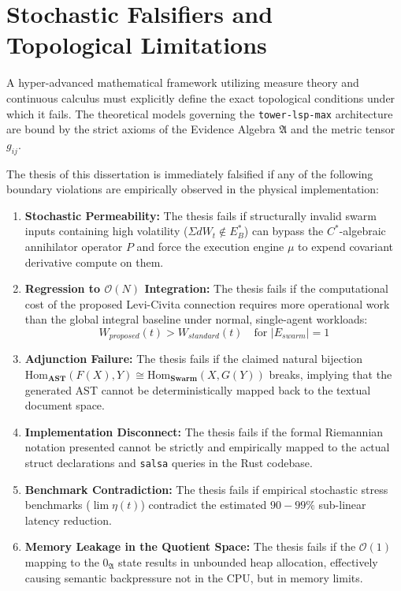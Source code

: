 \section{Stochastic Falsifiers and Topological Limitations}

A hyper-advanced mathematical framework utilizing measure theory and continuous calculus must explicitly define the exact topological conditions under which it fails. The theoretical models governing the \texttt{tower-lsp-max} architecture are bound by the strict axioms of the Evidence Algebra $\mathfrak{A}$ and the metric tensor $g_{ij}$. 

The thesis of this dissertation is immediately falsified if any of the following boundary violations are empirically observed in the physical implementation:

\begin{enumerate}
    \item \textbf{Stochastic Permeability:} The thesis fails if structurally invalid swarm inputs containing high volatility ($\Sigma dW_t \notin E_B^*$) can bypass the $C^*$-algebraic annihilator operator $P$ and force the execution engine $\mu$ to expend covariant derivative compute on them.
    \item \textbf{Regression to $\mathcal{O}(N)$ Integration:} The thesis fails if the computational cost of the proposed Levi-Civita connection requires more operational work than the global integral baseline under normal, single-agent workloads:
    \begin{equation}
    W_{proposed}(t) > W_{standard}(t) \quad \text{for } |E_{swarm}| = 1
    \end{equation}
    \item \textbf{Adjunction Failure:} The thesis fails if the claimed natural bijection $\text{Hom}_{\mathbf{AST}}(F(X), Y) \cong \text{Hom}_{\mathbf{Swarm}}(X, G(Y))$ breaks, implying that the generated AST cannot be deterministically mapped back to the textual document space.
    \item \textbf{Implementation Disconnect:} The thesis fails if the formal Riemannian notation presented cannot be strictly and empirically mapped to the actual struct declarations and \texttt{salsa} queries in the Rust codebase.
    \item \textbf{Benchmark Contradiction:} The thesis fails if empirical stochastic stress benchmarks ($\lim \eta(t)$) contradict the estimated $90-99\%$ sub-linear latency reduction.
    \item \textbf{Memory Leakage in the Quotient Space:} The thesis fails if the $\mathcal{O}(1)$ mapping to the $0_{\mathfrak{A}}$ state results in unbounded heap allocation, effectively causing semantic backpressure not in the CPU, but in memory limits.
\end{enumerate}

